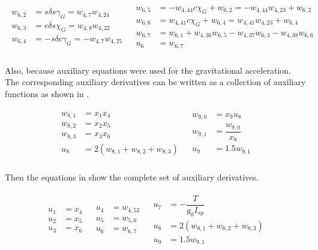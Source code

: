 \begin{align} \label{eq:u6AuxF}
\begin{split}
w_{6,2} &= s\delta s\gamma_{G} = w_{4,7}w_{4,24} \\
w_{6,3} &= c\delta s\chi_{G} = w_{4,8}w_{4,22} \\
w_{6,4} &= -s\delta c\gamma_{G} = -w_{4,7}w_{4,25} \\
\end{split}
&
\begin{split}
w_{6,5} &= -w_{4,44} c\chi_{G} +w_{6,2} = -w_{4,44}w_{4,23}+w_{6,2} \\
w_{6,6} &= w_{4,41} c\chi_{G} + w_{6,4} = w_{4,41}w_{4,23}+w_{6,4} \\
w_{6,7} &= w_{6,1} + w_{4,36}w_{6,5}-w_{4,37}w_{6,3}-w_{4,38}w_{6,6} \\
u_{6} &= w_{6,7} \\
\end{split}
\end{align}

\noindent
Also, because auxiliary equations were used for the gravitational acceleration. The corresponding auxiliary derivatives can be written as a collection of auxiliary functions as shown in .

\begin{align} \label{eq:u8u9AuxF}
\begin{split}
w_{8,1} &= x_{1}x_{4} \\
w_{8,2} &= x_{2}x_{5} \\
w_{8,3} &= x_{3}x_{6} \\
u_{8} &= 2\left(w_{8,1}+w_{8,2}+w_{8,3}\right) \\ 
\end{split}
&
\begin{split}
w_{9,0} &= x_{9}u_{8} \\
w_{9,1} &= \dfrac{w_{9,0}}{x_{8}} \\
u_{9} &= 1.5 w_{9,1} \\
\end{split}
\end{align}

\noindent
Then the equations in  show the complete set of auxiliary derivatives.

\begin{align} \label{eq:restAuxD}
\begin{split}
u_{1} &= x_{4} \\
u_{2} &= x_{5} \\
u_{3} &= x_{6} \\
\end{split}
&
\begin{split}
u_{4} &= w_{4,52} \\
u_{5} &= w_{5,6} \\
u_{6} &= w_{6,7} \\
\end{split}
&
\begin{split}
u_{7} &= -\dfrac{T}{g_{0}I_{sp}} \\
u_{8} &= 2\left(w_{8,1}+w_{8,2}+w_{8,3}\right)\\
u_{9} &= 1.5 w_{9,1} \\
\end{split}
\end{align}


